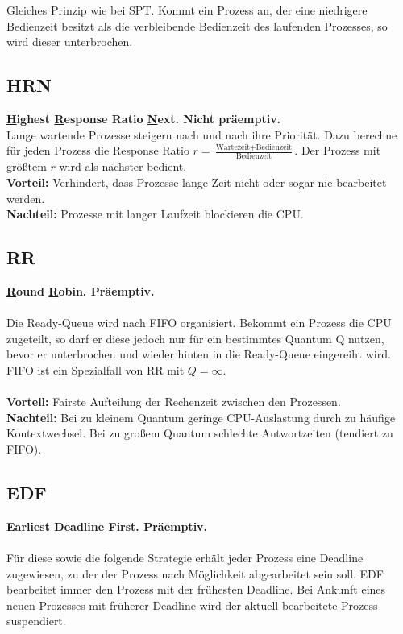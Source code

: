 \documentclass[11pt]{scrartcl}
\begin{document}
Gleiches Prinzip wie bei SPT. Kommt ein Prozess an, der eine niedrigere Bedienzeit besitzt als die verbleibende Bedienzeit des laufenden Prozesses, so wird dieser unterbrochen.

\subsection{HRN}
\textbf{\underline Highest \underline Response Ratio \underline Next. Nicht präemptiv.}\\

Lange wartende Prozesse steigern nach und nach ihre Priorität. Dazu berechne für jeden Prozess die Response Ratio \(r = \frac{\textrm{Wartezeit} + \textrm{Bedienzeit}}{\textrm{Bedienzeit}}\). Der Prozess mit größtem $r$ wird als nächster bedient.\\

\textbf{Vorteil:} Verhindert, dass Prozesse lange Zeit nicht oder sogar nie bearbeitet werden.\\
\textbf{Nachteil:} Prozesse mit langer Laufzeit blockieren die CPU.

\subsection{RR}
\textbf{\underline Round \underline Robin. Präemptiv.}\\
\\
Die Ready-Queue wird nach FIFO organisiert. Bekommt ein Prozess die CPU zugeteilt, so darf er diese jedoch nur für ein bestimmtes Quantum Q nutzen, bevor er unterbrochen und wieder hinten in die Ready-Queue eingereiht wird. FIFO ist ein Spezialfall von RR mit \(Q = \infty\).\\
\\
\textbf{Vorteil:} Fairste Aufteilung der Rechenzeit zwischen den Prozessen.\\
\textbf{Nachteil:} Bei zu kleinem Quantum geringe CPU-Auslastung durch zu häufige Kontextwechsel. Bei zu großem Quantum schlechte Antwortzeiten (tendiert zu FIFO).

\subsection{EDF}
\textbf{\underline Earliest \underline Deadline \underline First. Präemptiv.}\\
\\
Für diese sowie die folgende Strategie erhält jeder Prozess eine Deadline zugewiesen, zu der der Prozess nach Möglichkeit abgearbeitet sein soll. EDF bearbeitet immer den Prozess mit der frühesten Deadline. Bei Ankunft eines neuen Prozesses mit früherer Deadline wird der aktuell bearbeitete Prozess suspendiert.
\end{document}
